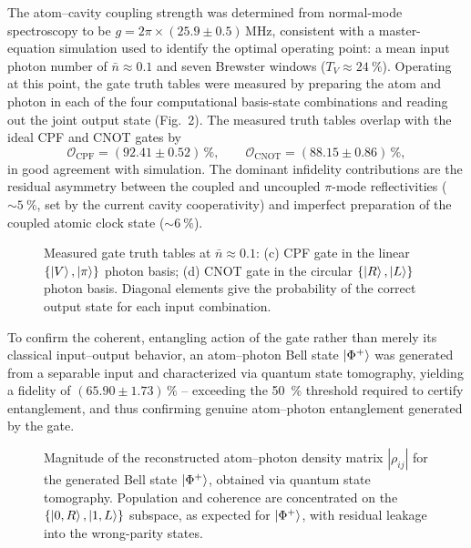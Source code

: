 \documentclass[10pt,a4paper]{article}
\begin{document}
The atom--cavity coupling strength was determined from normal-mode spectroscopy to be $g = 2\pi\times(25.9\pm0.5)\,\si{\mega\hertz}$, consistent with a master-equation simulation used to identify the optimal operating point: a mean input photon number of $\bar{n}\approx0.1$ and seven Brewster windows ($T_V\approx\SI{24}{\percent}$). Operating at this point, the gate truth tables were measured by preparing the atom and photon in each of the four computational basis-state combinations and reading out the joint output state (Fig.~2). The measured truth tables overlap with the ideal CPF and CNOT gates by
\[
	\mathcal{O}_{\text{CPF}} = (92.41\pm0.52)\,\%, \qquad \mathcal{O}_{\text{CNOT}} = (88.15\pm0.86)\,\%,
\]
in good agreement with simulation. The dominant infidelity contributions are the residual asymmetry between the coupled and uncoupled $\pi$-mode reflectivities ($\sim\SI{5}{\percent}$, set by the current cavity cooperativity) and imperfect preparation of the coupled atomic clock state ($\sim\SI{6}{\percent}$).

\begin{figure}[!htb]
	\centering
	
	\caption{Measured gate truth tables at $\bar{n}\approx0.1$: (c) CPF gate in the linear $\{\ket{V},\ket{\pi}\}$ photon basis; (d) CNOT gate in the circular $\{\ket{R},\ket{L}\}$ photon basis. Diagonal elements give the probability of the correct output state for each input combination.}
\end{figure}

To confirm the coherent, entangling action of the gate rather than merely its classical input--output behavior, an atom--photon Bell state $\ket{\Phi^+}$ was generated from a separable input and characterized via quantum state tomography, yielding a fidelity of $(65.90\pm1.73)\,\%$ -- exceeding the \SI{50}{\percent} threshold required to certify entanglement, and thus confirming genuine atom--photon entanglement generated by the gate.

\begin{figure}[!htb]
	\centering
	
	\caption{Magnitude of the reconstructed atom--photon density matrix $|\rho_{ij}|$ for the generated Bell state $\ket{\Phi^+}$, obtained via quantum state tomography. Population and coherence are concentrated on the $\{\ket{0,R},\ket{1,L}\}$ subspace, as expected for $\ket{\Phi^+}$, with residual leakage into the wrong-parity states.}
\end{figure}
\end{document}
